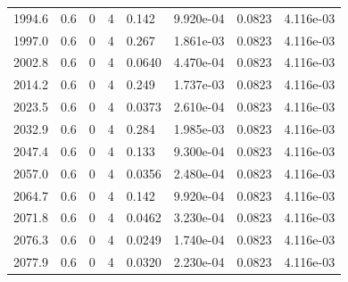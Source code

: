 \documentclass[preview]{standalone}
\begin{document}
{{{{{{{{{\begin{tabular}{L{1.2cm}C{1.2cm} C{0.3cm}C{0.5cm} C{1.4cm}C{1.4cm} C{1.4cm}C{1.4cm}}
  1994.6  &   0.6  & 0     &  4 &  0.142  & 9.920e-04  & 0.0823 &  4.116e-03   \\ 
  1997.0  &   0.6  & 0     &  4 &  0.267  & 1.861e-03  & 0.0823 &  4.116e-03   \\ 
  2002.8  &   0.6  & 0     &  4 &  0.0640  & 4.470e-04  & 0.0823 &  4.116e-03   \\ 
  2014.2  &   0.6  & 0     &  4 &  0.249  & 1.737e-03  & 0.0823 &  4.116e-03   \\ 
  2023.5  &   0.6  & 0     &  4 &  0.0373  & 2.610e-04  & 0.0823 &  4.116e-03   \\ 
  2032.9  &   0.6  & 0     &  4 &  0.284  & 1.985e-03  & 0.0823 &  4.116e-03   \\ 
  2047.4  &   0.6  & 0     &  4 &  0.133  & 9.300e-04  & 0.0823 &  4.116e-03   \\ 
  2057.0  &   0.6  & 0     &  4 &  0.0356  & 2.480e-04  & 0.0823 &  4.116e-03   \\ 
  2064.7  &   0.6  & 0     &  4 &  0.142  & 9.920e-04  & 0.0823 &  4.116e-03   \\ 
  2071.8  &   0.6  & 0     &  4 &  0.0462  & 3.230e-04  & 0.0823 &  4.116e-03   \\ 
  2076.3  &   0.6  & 0     &  4 &  0.0249  & 1.740e-04  & 0.0823 &  4.116e-03   \\ 
  2077.9  &   0.6  & 0     &  4 &  0.0320  & 2.230e-04  & 0.0823 &  4.116e-03   \\ 
\hline 
\end{tabular} 

}}}}}}}}}
\end{document}
